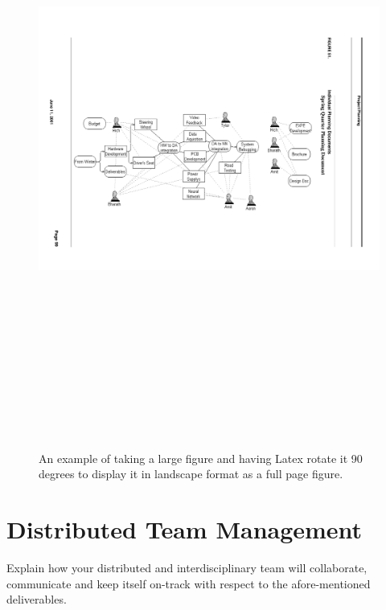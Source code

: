 \begin{figure}[p]   %
\centering
		\includegraphics[angle=90, height= 8in]{Figures/Ch6/ideastorm}
	\caption[Rotated landscape figure example]{An example of taking a large figure and having Latex rotate it 90 degrees to display it in landscape format as a full page figure.}
	\label{fig:full-page-example}  %
\end{figure}

\section{Distributed Team Management}
Explain how your distributed and interdisciplinary team will collaborate, communicate and keep itself on-track with respect to the afore-mentioned deliverables.

